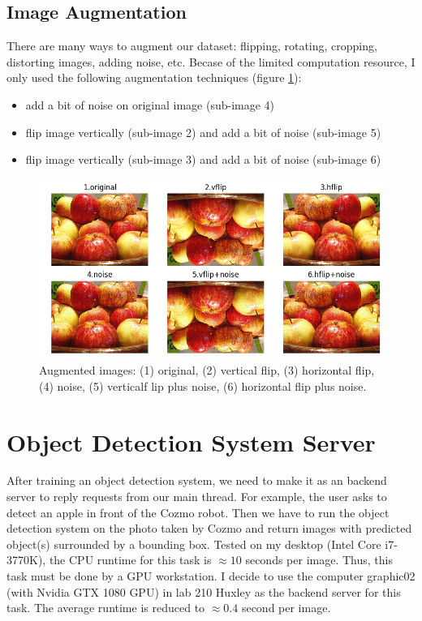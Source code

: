 \subsection{Image Augmentation}
There are many ways to augment our dataset: flipping, rotating, cropping, distorting images, adding noise, etc. Becase of the limited computation resource, I only used the following augmentation techniques (figure \ref{fig:augment1}):
\begin{itemize}
	\item add a bit of noise on original image (sub-image 4)
	\item flip image vertically (sub-image 2) and add a bit of noise (sub-image 5)
	\item flip image vertically (sub-image 3) and add a bit of noise (sub-image 6)
\end{itemize}
\begin{figure}[bh!]
	\centering
	\includegraphics[width=0.8\hsize]{./figures/augment1}
	\caption{Augmented images: (1) original, (2) vertical flip, (3) horizontal flip, (4) noise, (5) verticalf lip plus noise, (6) horizontal flip plus noise.}
	\label{fig:augment1}
\end{figure}

\section{Object Detection System Server}
\label{sec:socketConnect}
After training an object detection system, we need to make it as an backend server to reply requests from our main thread. For example, the user asks to detect an apple in front of the Cozmo robot. Then we have to run the object detection system on the photo taken by Cozmo and return images with predicted object(s) surrounded by a bounding box. Tested on my desktop (Intel Core i7-3770K), the CPU runtime for this task is $\approx 10$ seconds per image. Thus, this task must be done by a GPU workstation. I decide to use the computer graphic02 (with Nvidia GTX 1080 GPU) in lab 210 Huxley as the backend server for this task. The average runtime is reduced to $\approx 0.4$ second per image.

